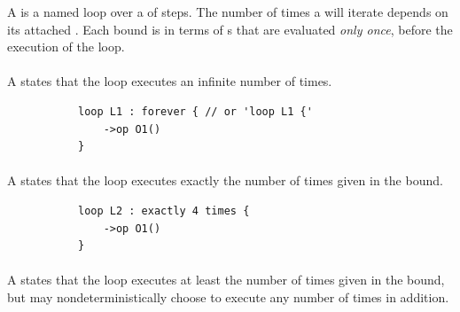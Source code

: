 A \mloopstep{} is a named loop over a \msubsequence{} of steps.
The number of times a \mloopstep{} will iterate 
depends on its attached \mloopbound{}.  Each bound is in terms of
\mexpression{}s that are evaluated \emph{only once}, before the execution
of the loop.

\paragraph{\minfiniteloopbound}
A \minfiniteloopbound{} states that the loop executes an infinite
number of times.

\begin{figure}[H]
\begin{subfigure}[t]{\egtextwidth}
\begin{lstlisting}[style=Example]
loop L1 : forever { // or 'loop L1 {'
    ->op O1()
}
\end{lstlisting}
\end{subfigure}
\hfill
\begin{subfigure}[t]{\eggraphicalwidth}
  \gsecaption
  \centering
\end{subfigure}
\end{figure}

\paragraph{\mdefiniteloopbound}
A \mdefiniteloopbound{} states that the loop executes exactly the
number of times given in the bound.

\begin{figure}[H]
\begin{subfigure}[t]{\egtextwidth}
\begin{lstlisting}[style=Example]
loop L2 : exactly 4 times {
    ->op O1()
}
\end{lstlisting}
\end{subfigure}
\hfill
\begin{subfigure}[t]{\eggraphicalwidth}
  \gsecaption
  \centering
\end{subfigure}
\end{figure}

\paragraph{\mlowerloopbound}
A \mlowerloopbound{} states that the loop executes at least the
number of times given in the bound, but may nondeterministically
choose to execute any number of times in addition.

